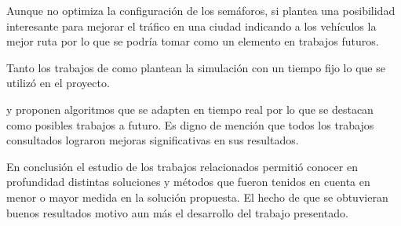 Aunque \citet{Stolfi2012} no optimiza la configuración de los semáforos, si plantea una posibilidad interesante para mejorar el tráfico en una ciudad indicando a los vehículos la mejor ruta por lo que se podría tomar como un elemento en trabajos futuros.

Tanto los trabajos de \citet{Teo2010} como \citet{Stolfi2012} plantean la simulación con un tiempo fijo lo que se utilizó en el proyecto.

\citet{Montana1996} y \citet{Vogel2000}  proponen algoritmos que se adapten en tiempo real por lo que se destacan como posibles trabajos a futuro.
Es digno de mención que todos los trabajos consultados lograron mejoras significativas en sus resultados.

En conclusión el estudio de los trabajos relacionados permitió conocer en profundidad distintas soluciones y métodos que fueron tenidos en cuenta en menor o mayor medida en la solución propuesta. El hecho de que se obtuvieran buenos resultados motivo aun más el desarrollo del trabajo presentado.





